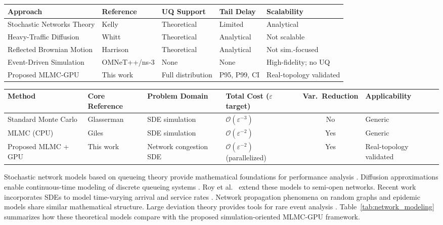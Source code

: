 \documentclass[pdflatex,sn-mathphys-num]{sn-jnl}
\theoremstyle{thmstyleone}%
\theoremstyle{thmstyletwo}%
\theoremstyle{thmstylethree}%
\begin{document}
\begin{table}
\vspace{1cm} %
\label{tab:network_modeling}
\begin{tabular}{lllll}
\toprule
Approach & Reference & UQ Support & Tail Delay & Scalability \\
\midrule
Stochastic Networks Theory & Kelly \cite{kelly2011stochastic} & Theoretical & Limited & Analytical \\
Heavy-Traffic Diffusion & Whitt \cite{whitt2002} & Theoretical & Analytical & Not scalable \\
Reflected Brownian Motion & Harrison \cite{harrison1985} & Theoretical & Analytical & Not sim.-focused \\
Event-Driven Simulation & OMNeT++/ns-3 \cite{perumalla2011discrete} & None & None & High-fidelity; no UQ \\
Proposed MLMC-GPU & This work & Full distribution & P95, P99, CI & Real-topology validated \\
\bottomrule
\end{tabular}
\vspace{1cm}
\label{tab:complexity}
\begin{tabular}{llllcl}
\toprule
Method & Core Reference & Problem Domain & Total Cost ($\varepsilon$ target) &
Var.\ Reduction & Applicability \\
\midrule
Standard Monte Carlo & Glasserman \cite{glasserman2003monte} & SDE simulation &
$\mathcal{O}(\varepsilon^{-3})$ & No & Generic \\
MLMC (CPU) & Giles \cite{giles2008multilevel,giles2015multilevel} & SDE simulation &
$\mathcal{O}(\varepsilon^{-2})$ & Yes & Generic \\
Proposed MLMC + GPU & This work & Network congestion SDE &
$\mathcal{O}(\varepsilon^{-2})$ (parallelized) & Yes & Real-topology validated \\
\bottomrule
\end{tabular}


\end{table}

Stochastic network models based on queueing theory provide mathematical foundations for
performance analysis \cite{kelly2011stochastic,whitt2002}. Diffusion approximations enable
continuous-time modeling of discrete queueing systems \cite{kang2007,harrison1985}. Roy et al.\
\cite{roy2016} extend these models to semi-open networks. Recent work incorporates SDEs to model
time-varying arrival and service rates \cite{mandelbaum2014stochastic}. Network propagation
phenomena on random graphs \cite{hofstad2016} and epidemic models \cite{kenah2011} share similar
mathematical structure. Large deviation theory provides tools for rare event analysis
\cite{chatterjee2017}. Table~\ref{tab:network_modeling} summarizes how these theoretical models
compare with the proposed simulation-oriented MLMC-GPU framework.
\end{document}

